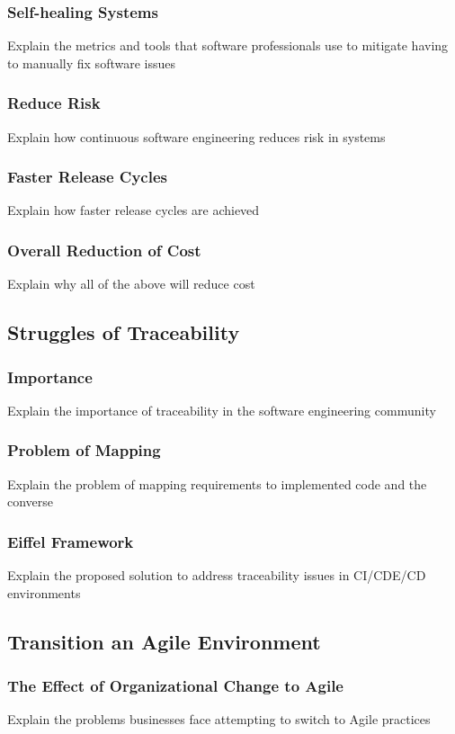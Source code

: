 \documentclass[11pt,a4paper]{article}
\begin{document}
		\subsubsection{Self-healing Systems}
		Explain the metrics and tools that software professionals use to mitigate having to manually fix software issues
		\subsubsection{Reduce Risk}
		Explain how continuous software engineering reduces risk in systems 
		\subsubsection{Faster Release Cycles}
		Explain how faster release cycles are achieved
		\subsubsection{Overall Reduction of Cost}
		Explain why all of the above will reduce cost
		
	\subsection{Struggles of Traceability}
		\subsubsection{Importance}
		Explain the importance of traceability in the software engineering community
		\subsubsection{Problem of Mapping}
		Explain the problem of mapping requirements to implemented code and the converse
		\subsubsection{Eiffel Framework}
		Explain the proposed solution to address traceability issues in CI/CDE/CD environments
		
	\subsection{Transition an Agile Environment}
		\subsubsection{The Effect of Organizational Change to Agile}
		Explain the problems businesses face attempting to switch to Agile practices
\end{document}
